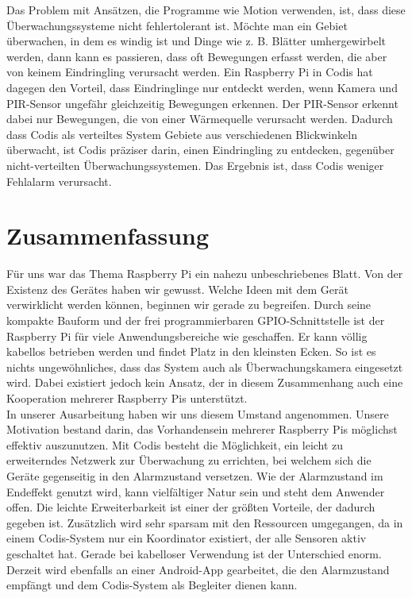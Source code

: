 \documentclass[journal]{IEEEtran}
\begin{document}
Das Problem mit Ansätzen, die Programme wie Motion verwenden, ist, dass diese Überwachungssysteme nicht fehlertolerant ist. Möchte man ein Gebiet überwachen, in dem es windig ist und Dinge wie z. B. Blätter umhergewirbelt werden, dann kann es passieren, dass oft Bewegungen erfasst werden, die aber von keinem Eindringling verursacht werden. Ein Raspberry Pi in Codis hat dagegen den Vorteil, dass Eindringlinge nur entdeckt werden, wenn Kamera und PIR-Sensor ungefähr gleichzeitig Bewegungen erkennen. Der PIR-Sensor erkennt dabei nur Bewegungen, die von einer Wärmequelle verursacht werden.\cite{raspi} Dadurch dass Codis als verteiltes System Gebiete aus verschiedenen Blickwinkeln überwacht, ist Codis präziser darin, einen Eindringling zu entdecken, gegenüber nicht-verteilten Überwachungssystemen. Das Ergebnis ist, dass Codis weniger Fehlalarm verursacht.

\section{Zusammenfassung}
Für uns war das Thema Raspberry Pi ein nahezu unbeschriebenes Blatt. Von der Existenz des Gerätes haben wir gewusst. Welche Ideen mit dem Gerät verwirklicht werden können, beginnen wir gerade zu begreifen. Durch seine kompakte Bauform und der frei programmierbaren GPIO-Schnittstelle ist der Raspberry Pi für viele Anwendungsbereiche wie geschaffen. Er kann völlig kabellos betrieben werden und findet Platz in den kleinsten Ecken. So ist es nichts ungewöhnliches, dass das System auch als Überwachungskamera eingesetzt wird. Dabei existiert jedoch kein Ansatz, der in diesem Zusammenhang auch eine Kooperation mehrerer Raspberry Pis unterstützt. \\In unserer Ausarbeitung haben wir uns diesem Umstand angenommen. Unsere Motivation bestand darin, das Vorhandensein mehrerer Raspberry Pis möglichst effektiv auszunutzen. Mit Codis besteht die Möglichkeit, ein leicht zu erweiterndes Netzwerk zur Überwachung zu errichten, bei welchem sich die Geräte gegenseitig in den Alarmzustand versetzen. Wie der Alarmzustand im Endeffekt genutzt wird, kann vielfältiger Natur sein und steht dem Anwender offen. Die leichte Erweiterbarkeit ist einer der größten Vorteile, der dadurch gegeben ist. Zusätzlich wird sehr sparsam mit den Ressourcen umgegangen, da in einem Codis-System nur ein Koordinator existiert, der alle Sensoren aktiv geschaltet hat. Gerade bei kabelloser Verwendung ist der Unterschied enorm. Derzeit wird ebenfalls an einer Android-App gearbeitet, die den Alarmzustand empfängt und dem Codis-System als Begleiter dienen kann.



\printbibliography
\end{document}
